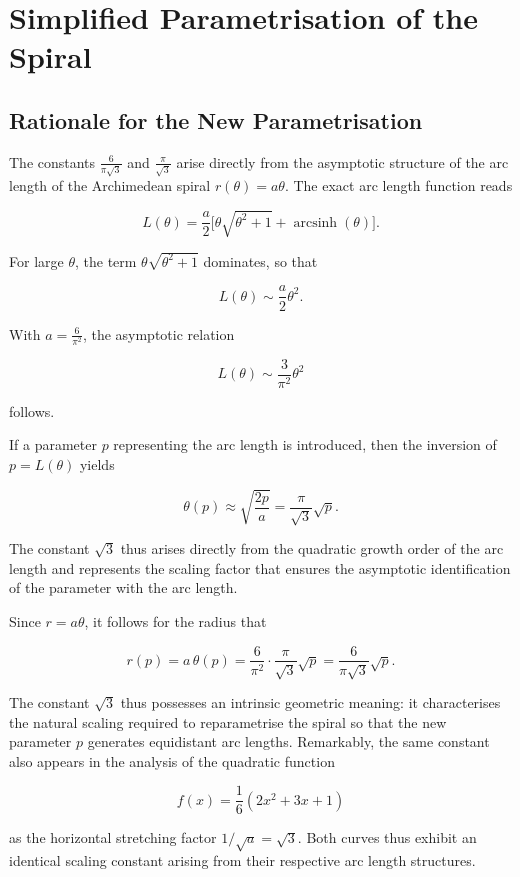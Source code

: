 \chapter{Simplified Parametrisation of the Spiral}
\section{Rationale for the New Parametrisation}
The constants \(\frac{6}{\pi\sqrt{3}}\) and \(\frac{\pi}{\sqrt{3}}\) arise
directly from the asymptotic structure of the arc length of the Archimedean spiral
\(r(\theta)=a\theta\). The exact arc length function reads


\[
L(\theta)=\frac{a}{2}\bigl[\theta\sqrt{\theta^{2}+1}+\operatorname{arcsinh}(\theta)\bigr].
\]


For large \(\theta\), the term \(\theta\sqrt{\theta^{2}+1}\) dominates, so that


\[
L(\theta)\sim \frac{a}{2}\theta^{2}.
\]


With \(a=\frac{6}{\pi^{2}}\), the asymptotic relation


\[
L(\theta)\sim \frac{3}{\pi^{2}}\theta^{2}
\]


follows.

If a parameter \(p\) representing the arc length is introduced, then
the inversion of \(p=L(\theta)\) yields


\[
\theta(p)\approx \sqrt{\frac{2p}{a}}
= \frac{\pi}{\sqrt{3}}\sqrt{p}.
\]


The constant \(\sqrt{3}\) thus arises directly from the quadratic
growth order of the arc length and represents the scaling factor that ensures
the asymptotic identification of the parameter with the arc length.

Since \(r=a\theta\), it follows for the radius that


\[
r(p)=a\,\theta(p)
= \frac{6}{\pi^{2}}\cdot\frac{\pi}{\sqrt{3}}\sqrt{p}
= \frac{6}{\pi\sqrt{3}}\sqrt{p}.
\]



The constant \(\sqrt{3}\) thus possesses an intrinsic geometric meaning:
it characterises the natural scaling required to reparametrise the
spiral so that the new parameter \(p\) generates equidistant
arc lengths. Remarkably, the same constant also appears in the
analysis of the quadratic function


\[
f(x)=\frac{1}{6}(2x^{2}+3x+1)
\]


as the horizontal stretching factor \(1/\sqrt{a}=\sqrt{3}\). Both curves
thus exhibit an identical scaling constant arising from their respective
arc length structures.


